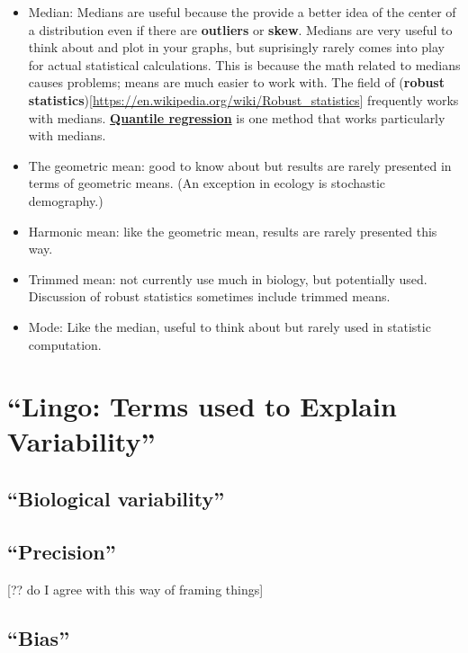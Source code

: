 \documentclass[]{book}
\providecommand{\tightlist}{%
  \setlength{\itemsep}{0pt}\setlength{\parskip}{0pt}}
\theoremstyle{definition}
\theoremstyle{definition}
\theoremstyle{definition}
\theoremstyle{remark}
\begin{document}
\begin{itemize}
\tightlist
\item
  Median: Medians are useful because the provide a better idea of the
  center of a distribution even if there are \textbf{outliers} or
  \textbf{skew}. Medians are very useful to think about and plot in your
  graphs, but suprisingly rarely comes into play for actual statistical
  calculations. This is because the math related to medians causes
  problems; means are much easier to work with. The field of
  (\textbf{robust
  statistics}){[}\url{https://en.wikipedia.org/wiki/Robust_statistics}{]}
  frequently works with medians.
  \href{https://en.wikipedia.org/wiki/Quantile_regression}{\textbf{Quantile
  regression}} is one method that works particularly with medians.
\item
  The geometric mean: good to know about but results are rarely
  presented in terms of geometric means. (An exception in ecology is
  stochastic demography.)
\item
  Harmonic mean: like the geometric mean, results are rarely presented
  this way.
\item
  Trimmed mean: not currently use much in biology, but potentially used.
  Discussion of robust statistics sometimes include trimmed means.
\item
  Mode: Like the median, useful to think about but rarely used in
  statistic computation.
\end{itemize}

\section{\texorpdfstring{``Lingo: Terms used to Explain
Variability''}{Lingo: Terms used to Explain Variability}}\label{lingo-terms-used-to-explain-variability}

\subsection{\texorpdfstring{``Biological
variability''}{Biological variability}}\label{biological-variability}

\subsection{\texorpdfstring{``Precision''}{Precision}}\label{precision}

{[}?? do I agree with this way of framing things{]}

\subsection{\texorpdfstring{``Bias''}{Bias}}\label{bias}
\end{document}
